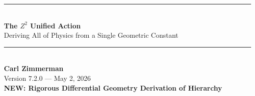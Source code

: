 \documentclass[11pt,a4paper]{article}
\theoremstyle{plain}
\theoremstyle{definition}
\theoremstyle{remark}
\begin{document}

\begin{center}
\rule{\textwidth}{1.5pt}\\[0.5cm]
{\LARGE\bfseries The $Z^2$ Unified Action}\\[0.3cm]
{\Large Deriving All of Physics from a Single Geometric Constant}\\[0.5cm]
\rule{\textwidth}{1.5pt}\\[0.8cm]

{\large\bfseries Carl Zimmerman}\\[0.3cm]
Version 7.2.0 --- May 2, 2026\\[0.3cm]
\textcolor{newcolor}{\textbf{NEW: Rigorous Differential Geometry Derivation of Hierarchy}}
\end{center}

\vspace{1cm}

\end{document}
